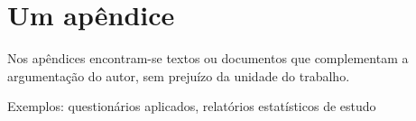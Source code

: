 \chapter{Um apêndice}

Nos apêndices encontram-se textos ou documentos que complementam a argumentação do autor, sem prejuízo da unidade do trabalho. 

Exemplos: questionários aplicados, relatórios estatísticos de estudo

